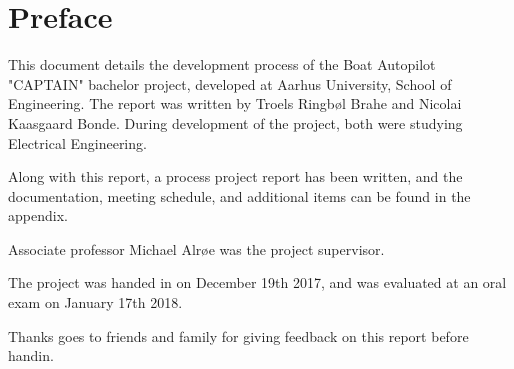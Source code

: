 \chapter{Preface}
This document details the development process of the Boat Autopilot "CAPTAIN" bachelor project, developed at Aarhus University, School of Engineering. The report was written by Troels Ringbøl Brahe and Nicolai Kaasgaard Bonde. During development of the project, both were studying Electrical Engineering.

Along with this report, a process project report has been written, and the documentation, meeting schedule, and additional items can be found in the appendix.

Associate professor Michael Alrøe was the project supervisor.

The project was handed in on December 19th 2017, and was evaluated at an oral exam on January 17th 2018.

Thanks goes to friends and family for giving feedback on this report before handin.